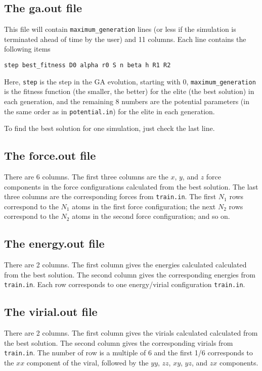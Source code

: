 \documentclass[12pt,a4paper]{report}
\begin{document}
\subsection{The ga.out file}

This file will contain \verb"maximum_generation" lines (or less if the simulation is terminated ahead of time by the user) and 11 columns. Each line contains the following items
\begin{verbatim}
step best_fitness D0 alpha r0 S n beta h R1 R2
\end{verbatim}
Here, \verb"step" is the step in the GA evolution, starting with 0, \verb"maximum_generation" is the fitness function (the smaller, the better) for the elite (the best solution) in each generation, and the remaining 8 numbers are the potential parameters (in the same order as in \verb"potential.in") for the elite in each generation.

To find the best solution for one simulation, just check the last line.

\subsection{The force.out file}

There are 6 columns. The first three columns are the $x$, $y$, and $z$ force components in the force configurations calculated from the best solution. The last three columns are the corresponding forces from \verb"train.in". The first $N_1$ rows correspond to the $N_1$ atoms in the first force configuration; the next $N_2$ rows correspond to the $N_2$ atoms in the second force configuration; and so on.

\subsection{The energy.out file}

There are 2 columns. The first column gives the energies calculated calculated from the best solution. The second column gives the corresponding energies from \verb"train.in". Each row corresponds to one energy/virial configuration \verb"train.in".

\subsection{The virial.out file}

There are 2 columns. The first column gives the virials calculated calculated from the best solution. The second column gives the corresponding virials from \verb"train.in". The number of row is a multiple of 6 and the first 1/6 corresponds to the $xx$ component of the viral, followed by the $yy$, $zz$, $xy$, $yz$, and $zx$ components.




\end{document}
